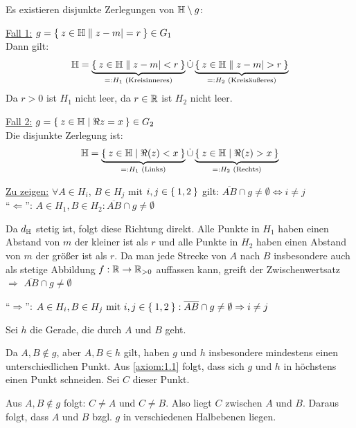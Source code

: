 \begin{beweis}
\begin{enumerate}[label=\alph*), ref=\theproposition (\alph*)]
              Es existieren disjunkte Zerlegungen von $\mathbb{H} \setminus g$:

              \underline{Fall 1:} $g = \Set{z \in \ensuremath{\mathbb{H}}| |z-m| = r} \in G_1$\\
              Dann gilt:
              \[\mathbb{H} = \underbrace{\Set{z \in \ensuremath{\mathbb{H}}| |z-m| < r}}_{=:H_1 \text{ (Kreisinneres)}} \mathbin{\dot{\cup}} \underbrace{\Set{z \in \ensuremath{\mathbb{H}}| |z-m| > r}}_{=:H_2 \text{ (Kreisäußeres)}}\]
              Da $r > 0$ ist $H_1$ nicht leer, da $r \in \mathbb{R}$ ist $H_2$ nicht leer.

              \underline{Fall 2:} $g = \Set{z \in \ensuremath{\mathbb{H}}| \Re{z} = x} \in G_2$\\
              Die disjunkte Zerlegung ist:
              \[\mathbb{H} = \underbrace{\Set{z \in \ensuremath{\mathbb{H}}| \Re(z) < x}}_{=: H_1 \text{ (Links)}} \mathbin{\dot{\cup}} \underbrace{\Set{z \in \ensuremath{\mathbb{H}}| \Re(z) > x}}_{=: H_2 \text{ (Rechts)}}\]

              \underline{Zu zeigen:}
              $\forall A \in H_i$, $B \in H_j$ mit
                      $i,j \in \Set{1,2}$ gilt: 
                      $\overline{AB} \cap g \neq \emptyset \Leftrightarrow i \neq j$\\
              \enquote{$\Leftarrow$}: $A \in H_1, B \in H_2: \overline{AB} \cap g \neq \emptyset$

              Da $d_{\mathbb{H}}$ stetig ist, folgt diese Richtung
              direkt. Alle Punkte in $H_1$ haben einen Abstand von $m$ der kleiner
              ist als $r$ und alle Punkte in $H_2$ haben einen Abstand von $m$ der
              größer ist als $r$. Da man jede Strecke von $A$ nach $B$ insbesondere
              auch als stetige Abbildung $f: \mathbb{R} \rightarrow \mathbb{R}_{>0}$ auffassen
              kann, greift der Zwischenwertsatz $\Rightarrow$ $\overline{AB} \cap g \neq \emptyset$

              \enquote{$\Rightarrow$}: $A \in H_i, B \in H_j \text{ mit } i,j \in \Set{1,2}: \overline{AB} \cap g \neq \emptyset \Rightarrow i \neq j$

              Sei $h$ die Gerade, die durch $A$ und $B$ geht.

              Da $A,B \notin g$, aber $A, B \in h$ gilt, haben $g$ und $h$ 
              insbesondere
              mindestens einen unterschiedlichen Punkt. Aus \ref{axiom:1.1} folgt, dass sich
              $g$ und $h$ in höchstens einen Punkt schneiden. Sei $C$ dieser 
              Punkt.

              Aus $A,B \notin g$ folgt: $C \neq A$ und $C \neq B$. Also liegt
              $C$ zwischen $A$ und $B$. Daraus folgt, dass $A$ und $B$ bzgl.
              $g$ in verschiedenen Halbebenen liegen.


\end{enumerate}
\end{beweis}
